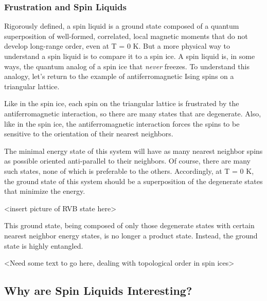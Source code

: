 \subsubsection{Frustration and Spin Liquids}

Rigorously defined, a spin liquid is a ground state composed of a quantum superposition of well-formed, correlated, local magnetic moments that do not develop long-range order, even at T = 0 K. But a more physical way to understand a spin liquid is to compare it to a spin ice. A spin liquid is, in some ways, the quantum analog of a spin ice that \textit{never} freezes. To understand this analogy, let's return to the example of antiferromagnetic Ising spins on a triangular lattice.

Like in the spin ice, each spin on the triangular lattice is frustrated by the antiferromagnetic interaction, so there are many states that are degenerate. Also, like in the spin ice, the antiferromagnetic interaction forces the spins to be sensitive to the orientation of their nearest neighbors.

The minimal energy state of this system will have as many nearest neighbor spins as possible oriented anti-parallel to their neighbors. Of course, there are many such states, none of which is preferable to the others. Accordingly, at T = 0 K, the ground state of this system should be a superposition of the degenerate states that minimize the energy.

<insert picture of RVB state here>

This ground state, being composed of only those degenerate states with certain nearest neighbor energy states, is no longer a product state. Instead, the ground state is highly entangled. 


<Need some text to go here, dealing with topological order in spin ices>
\subsection{Why are Spin Liquids Interesting?}
